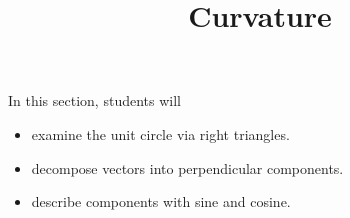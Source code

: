 \documentclass{ximera}
\title{Curvature}
\begin{document}
\begin{abstract}
\end{abstract}
\maketitle







\begin{sectionOutcomes}
In this section, students will 

\begin{itemize}
\item examine the unit circle via right triangles.
\item decompose vectors into perpendicular components.
\item describe components with sine and cosine.
\end{itemize}
\end{sectionOutcomes}
\end{document}
